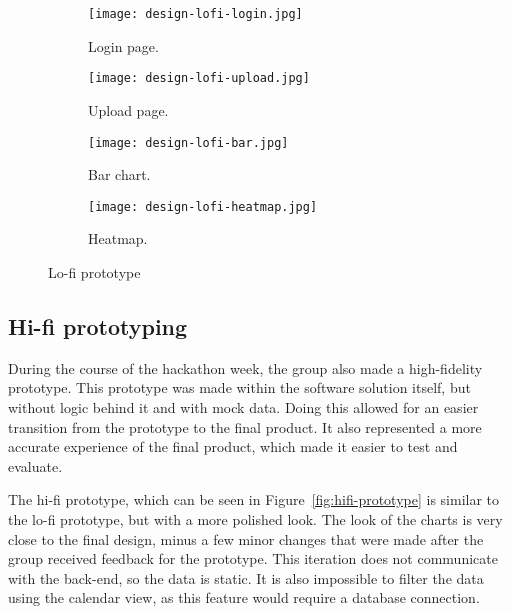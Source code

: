 \begin{figure}[H]
    \centering
    \begin{subfigure}{.49\textwidth}
        \centering
        \texttt{[image: design-lofi-login.jpg]}
        \caption{Login page.}\label{subfig:lofi-login}
    \end{subfigure}
    \begin{subfigure}{.49\textwidth}
        \centering
        \texttt{[image: design-lofi-upload.jpg]}
        \caption{Upload page.}\label{subfig:lofi-upload}
    \end{subfigure}
    \par\medskip
    \begin{subfigure}{.49\textwidth}
        \centering
        \texttt{[image: design-lofi-bar.jpg]}
        \caption{Bar chart.}\label{subfig:lofi-bar}
    \end{subfigure}
    \begin{subfigure}{.49\textwidth}
        \centering
        \texttt{[image: design-lofi-heatmap.jpg]}
        \caption{Heatmap.}\label{subfig:lofi-heatmap}
    \end{subfigure}
    \caption{Lo-fi prototype}\label{fig:lofi-prototype}
\end{figure}

\subsection{Hi-fi prototyping}\label{subsec:hi-fi-prototyping}

During the course of the hackathon week, the group also made a high-fidelity prototype.
This prototype was made within the software solution itself, but without logic behind it and with mock data.
Doing this allowed for an easier transition from the prototype to the final product.
It also represented a more accurate experience of the final product, which made it easier to test and evaluate.

The hi-fi prototype, which can be seen in Figure~\ref{fig:hifi-prototype} is similar to the lo-fi prototype, but with a
more polished look.
The look of the charts is very close to the final design, minus a few minor changes that were made after the group
received feedback for the prototype.
This iteration does not communicate with the back-end, so the data is static.
It is also impossible to filter the data using the calendar view, as this feature would require a database connection.

